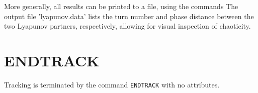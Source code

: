 More generally, all results can be printed to a file, using the commands 
The output file 'lyapunov.data' lists the turn number and phase distance
between the  two Lyapunov partners, respectively, allowing for visual
inspection of chaoticity.  
 



\section{ENDTRACK}
\label{sec:endtrack}

Tracking is terminated by the command \texttt{ENDTRACK} with no
attributes. 





